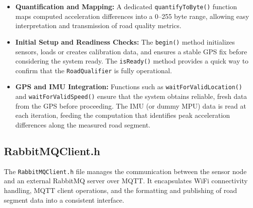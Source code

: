\begin{itemize}
    \item \textbf{Quantification and Mapping:}  
    A dedicated \texttt{quantifyToByte()} function maps computed acceleration differences into a 0–255 byte range, allowing easy interpretation and transmission of road quality metrics.

    \item \textbf{Initial Setup and Readiness Checks:}  
    The \texttt{begin()} method initializes sensors, loads or creates calibration data, and ensures a stable GPS fix before considering the system ready. The \texttt{isReady()} method provides a quick way to confirm that the \texttt{RoadQualifier} is fully operational.

    \item \textbf{GPS and IMU Integration:}  
    Functions such as \texttt{waitForValidLocation()} and \texttt{waitForValidSpeed()} ensure that the system obtains reliable, fresh data from the GPS before proceeding. The IMU (or dummy MPU) data is read at each iteration, feeding the computation that identifies peak acceleration differences along the measured road segment.
\end{itemize}


\subsection{RabbitMQClient.h}

The \texttt{RabbitMQClient.h} file manages the communication between the sensor node and an external RabbitMQ server over MQTT. It encapsulates WiFi connectivity handling, MQTT client operations, and the formatting and publishing of road segment data into a consistent interface.


